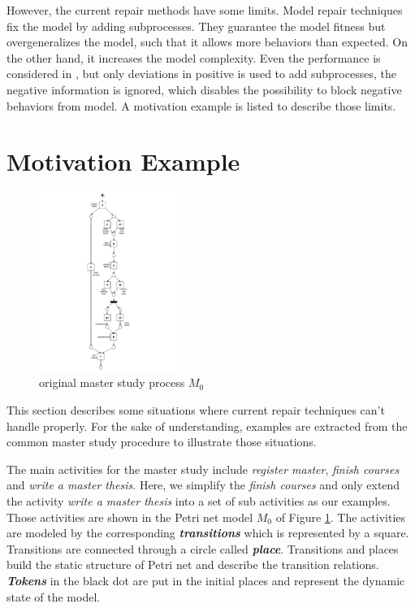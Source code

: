 However, the current repair methods have some limits. Model repair techniques fix the model by adding subprocesses. They guarantee the model fitness but overgeneralizes the model, such that it allows more behaviors than expected. On the other hand, it increases the model complexity.  Even the performance is considered in \cite{dees2017enhancing}, but only deviations in positive is used to add subprocesses, the negative information is ignored, which disables the possibility to block negative behaviors from model.  A motivation example is listed to describe those limits.
\section{Motivation Example}
\begin{figure}
	\centering
	\includegraphics[clip, trim=7cm 0cm 7cm 0cm, width=0.4\textwidth, height=0.7\textheight]{figures/introduction/Master-original-model.pdf}
	\caption{original master study process $M_0$}
	\label{fig:model_M0}
\end{figure}
This section describes some situations where current repair techniques can't handle properly. For the sake of understanding, examples are extracted from the common master study procedure to illustrate those situations.

The main activities for the master study include \emph{register master}, \emph{finish courses} and \emph{write a master thesis}. Here, we simplify the \emph{finish courses} and only extend the activity \emph{write a master thesis} into a set of sub activities as our examples. Those activities are shown in the Petri net model $M_0$ of Figure \ref{fig:model_M0}. The activities are modeled by the corresponding \textbf{\emph{transitions}} which is represented by a square. Transitions are connected through a circle called \textbf{\emph{place}}. Transitions and places build the static structure of Petri net and describe the transition relations. \textbf{\emph{Tokens}} in the black dot are put in the initial places and represent the dynamic state of the model. 

